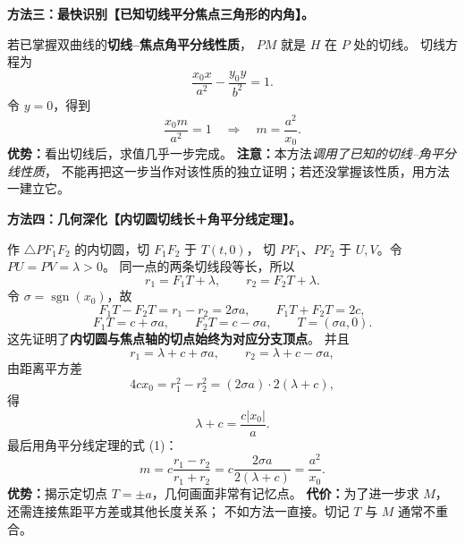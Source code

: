 \clearpage
\begin{proofbox}
\textbf{方法三：最快识别【已知切线平分焦点三角形的内角】。}

若已掌握双曲线的\textbf{切线--焦点角平分线性质}，
$PM$ 就是 $H$ 在 $P$ 处的切线。
切线方程为
\[
\frac{x_0x}{a^2}-\frac{y_0y}{b^2}=1.
\]
令 $y=0$，得到
\[
\frac{x_0m}{a^2}=1
\quad\Longrightarrow\quad
\boxed{m=\frac{a^2}{x_0}}.
\]
\textbf{优势：}看出切线后，求值几乎一步完成。
\textbf{注意：}本方法\emph{调用了已知的切线--角平分线性质}，
不能再把这一步当作对该性质的独立证明；若还没掌握该性质，用方法一建立它。

\medskip
\end{proofbox}
\clearpage
\begin{proofbox}
\textbf{方法四：几何深化【内切圆切线长＋角平分线定理】。}


作 $\triangle PF_1F_2$ 的内切圆，切 $F_1F_2$ 于 $T(t,0)$，
切 $PF_1$、$PF_2$ 于 $U,V$。令 $PU=PV=\lambda>0$。
同一点的两条切线段等长，所以
\[
r_1=F_1T+\lambda,\qquad
r_2=F_2T+\lambda.
\]
令 $\sigma=\operatorname{sgn}(x_0)$，故
\[
F_1T-F_2T=r_1-r_2=2\sigma a,
\qquad F_1T+F_2T=2c,
\]
\[
F_1T=c+\sigma a,\qquad
F_2T=c-\sigma a,
\qquad\boxed{T=(\sigma a,0)}.
\]
这先证明了\textbf{内切圆与焦点轴的切点始终为对应分支顶点}。
并且
\[
r_1=\lambda+c+\sigma a,\qquad
r_2=\lambda+c-\sigma a,
\]
由距离平方差
\[
4cx_0=r_1^2-r_2^2
=(2\sigma a)\cdot2(\lambda+c),
\]
得
\[
\lambda+c=\frac{c|x_0|}{a}.
\]
最后用角平分线定理的式 (1)：
\[
m=c\frac{r_1-r_2}{r_1+r_2}
=c\frac{2\sigma a}{2(\lambda+c)}
=\boxed{\frac{a^2}{x_0}}.
\]
\textbf{优势：}揭示定切点 $T=\pm a$，几何画面非常有记忆点。
\textbf{代价：}为了进一步求 $M$，还需连接焦距平方差或其他长度关系；
不如方法一直接。切记 $T$ 与 $M$ 通常不重合。

\medskip
\end{proofbox}
\clearpage
